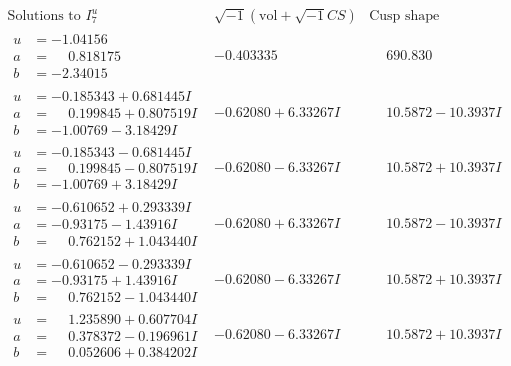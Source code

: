 \documentclass[1p]{elsarticle_modified}
\theoremstyle{definition}
\newcommand{\I}{\sqrt{-1}}
\begin{document}
$$\begin{array}{c|c|c}  
\text{Solutions to }I^u_{7}& \I (\text{vol} + \sqrt{-1}CS) & \text{Cusp shape}\\
 \hline 
\begin{aligned}
u &= -1.04156\phantom{ +0.000000I} \\
a &= \phantom{-}0.818175\phantom{ +0.000000I} \\
b &= -2.34015\phantom{ +0.000000I}\end{aligned}
 & -0.403335\phantom{ +0.000000I} & \phantom{-}690.830\phantom{ +0.000000I} \\ \hline\begin{aligned}
u &= -0.185343 + 0.681445 I \\
a &= \phantom{-}0.199845 + 0.807519 I \\
b &= -1.00769 - 3.18429 I\end{aligned}
 & -0.62080 + 6.33267 I & \phantom{-}10.5872 - 10.3937 I \\ \hline\begin{aligned}
u &= -0.185343 - 0.681445 I \\
a &= \phantom{-}0.199845 - 0.807519 I \\
b &= -1.00769 + 3.18429 I\end{aligned}
 & -0.62080 - 6.33267 I & \phantom{-}10.5872 + 10.3937 I \\ \hline\begin{aligned}
u &= -0.610652 + 0.293339 I \\
a &= -0.93175 - 1.43916 I \\
b &= \phantom{-}0.762152 + 1.043440 I\end{aligned}
 & -0.62080 + 6.33267 I & \phantom{-}10.5872 - 10.3937 I \\ \hline\begin{aligned}
u &= -0.610652 - 0.293339 I \\
a &= -0.93175 + 1.43916 I \\
b &= \phantom{-}0.762152 - 1.043440 I\end{aligned}
 & -0.62080 - 6.33267 I & \phantom{-}10.5872 + 10.3937 I \\ \hline\begin{aligned}
u &= \phantom{-}1.235890 + 0.607704 I \\
a &= \phantom{-}0.378372 - 0.196961 I \\
b &= \phantom{-}0.052606 + 0.384202 I\end{aligned}
 & -0.62080 - 6.33267 I & \phantom{-}10.5872 + 10.3937 I \\ \hline\begin{aligned}

\end{aligned}
\end{array}$$
\end{document}
